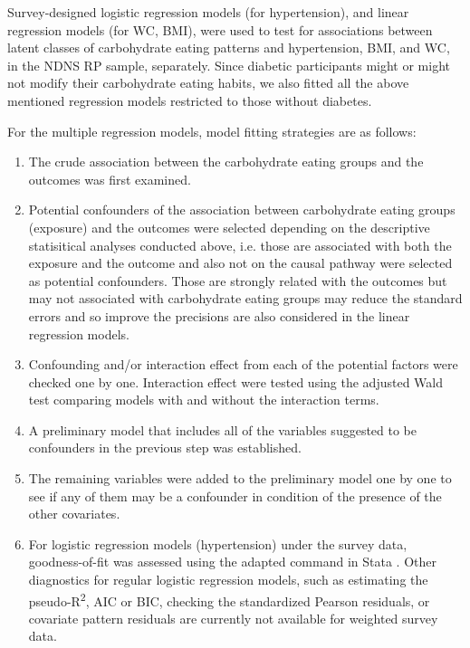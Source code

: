 

Survey-designed logistic regression models (for hypertension), and linear regression models (for WC, BMI), were used to test for associations between latent classes of carbohydrate eating patterns and hypertension, BMI, and WC, in the NDNS RP sample, separately. Since diabetic participants might or might not modify their carbohydrate eating habits, we also fitted all the above mentioned regression models restricted to those without diabetes.

For the multiple regression models, model fitting strategies are as follows: 

\begin{enumerate}
	\item The crude association between the carbohydrate eating groups and the outcomes was first examined. 
	\item Potential confounders of the association between carbohydrate eating groups (exposure) and the outcomes were selected depending on the descriptive statisitical analyses conducted above, i.e. those are associated with both the exposure and the outcome and also not on the causal pathway were selected as potential confounders. Those are strongly related with the outcomes but may not associated with carbohydrate eating groups may reduce the standard errors and so improve the precisions are also considered in the linear regression models. 
	\item Confounding and/or interaction effect from each of the potential factors were checked one by one. Interaction effect were tested using the adjusted Wald test comparing models with and without the interaction terms.  
	\item A preliminary model that includes all of the variables suggested to be confounders in the previous step was established. 
	\item The remaining variables were added to the preliminary model one by one to see if any of them may be a confounder in condition of the presence of the other covariates. 
	\item For logistic regression models (hypertension) under the survey data, goodness-of-fit was assessed using the adapted  command in Stata \parencite{archer2006goodness}. Other diagnostics for regular logistic regression models, such as estimating the pseudo-R\textsuperscript{2},  AIC or BIC, checking the standardized Pearson residuals, or covariate pattern residuals are currently not available for weighted survey data. 

\end{enumerate}
